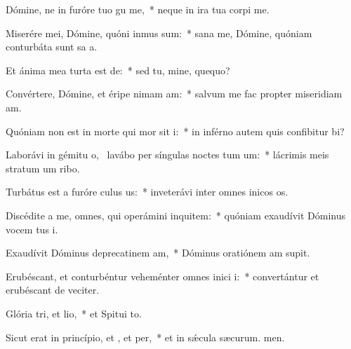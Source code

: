 \item Dómine, ne in furóre tuo gu me,~* neque in ira tua corpi me.
\item Miserére mei, Dómine, quóni inmus sum:~* sana me, Dómine, quóniam conturbáta sunt sa a.
\item Et ánima mea turta est de:~* sed tu, mine, quequo?
\item Convértere, Dómine, et éripe nimam am:~* salvum me fac propter miseridiam am.
\item Quóniam non est in morte qui mor sit i:~* in inférno autem quis confibitur bi?
\item Laborávi in gémitu o,~\pscross{} lavábo per síngulas noctes tum um:~* lácrimis meis stratum um ribo.
\item Turbátus est a furóre culus us:~* inveterávi inter omnes inicos os.
\item Discédite a me, omnes, qui operámini inquitem:~* quóniam exaudívit Dóminus vocem tus i.
\item Exaudívit Dóminus deprecatinem am,~* Dóminus oratiónem am supit.
\item Erubéscant, et conturbéntur veheménter omnes inici i:~* convertántur et erubéscant de veciter.
\item Glória tri, et lio,~* et Spitui to.
\item Sicut erat in princípio, et , et per,~* et in sǽcula sæcurum. men.
